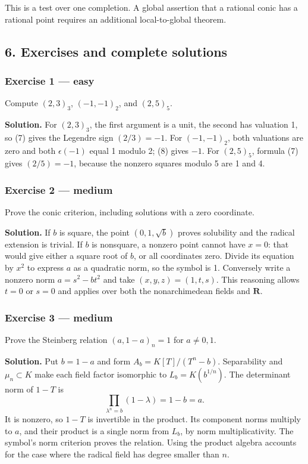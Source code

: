 \documentclass[11pt,a4paper]{article}
\begin{document}
This is a test over one completion. A global assertion that a rational
conic has a rational point requires an additional local-to-global
theorem.

\subsection{6. Exercises and complete
solutions}\label{exercises-and-complete-solutions}

\subsubsection{Exercise 1 --- easy}\label{exercise-1-easy}

Compute \((2,3)_3\), \((-1,-1)_2\), and \((2,5)_5\).

\textbf{Solution.} For \((2,3)_3\), the first argument is a unit, the
second has valuation 1, so (7) gives the Legendre sign \((2/3)=-1\). For
\((-1,-1)_2\), both valuations are zero and both \(\epsilon(-1)\) equal
1 modulo 2; (8) gives \(-1\). For \((2,5)_5\), formula (7) gives
\((2/5)=-1\), because the nonzero squares modulo 5 are 1 and 4.

\subsubsection{Exercise 2 --- medium}\label{exercise-2-medium}

Prove the conic criterion, including solutions with a zero coordinate.

\textbf{Solution.} If \(b\) is square, the point \((0,1,\sqrt b)\)
proves solubility and the radical extension is trivial. If \(b\) is
nonsquare, a nonzero point cannot have \(x=0\): that would give either a
square root of \(b\), or all coordinates zero. Divide its equation by
\(x^2\) to express \(a\) as a quadratic norm, so the symbol is 1.
Conversely write a nonzero norm \(a=s^2-bt^2\) and take
\((x,y,z)=(1,t,s)\). This reasoning allows \(t=0\) or \(s=0\) and
applies over both the nonarchimedean fields and \(\mathbf R\).

\subsubsection{Exercise 3 --- medium}\label{exercise-3-medium}

Prove the Steinberg relation \((a,1-a)_n=1\) for \(a\ne0,1\).

\textbf{Solution.} Put \(b=1-a\) and form \(A_b=K[T]/(T^n-b)\).
Separability and \(\mu_n\subset K\) make each field factor isomorphic to
\(L_b=K(b^{1/n})\). The determinant norm of \(1-T\) is \[
\prod_{\lambda^n=b}(1-\lambda)=1-b=a.
\] It is nonzero, so \(1-T\) is invertible in the product. Its component
norms multiply to \(a\), and their product is a single norm from
\(L_b\), by norm multiplicativity. The symbol's norm criterion proves
the relation. Using the product algebra accounts for the case where the
radical field has degree smaller than \(n\).
\end{document}
